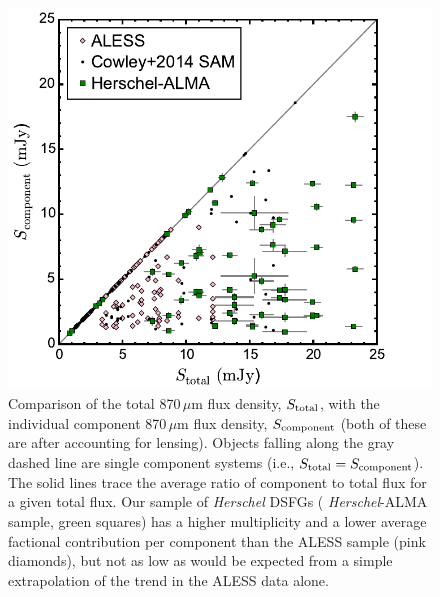 \documentclass[iop]{emulateapj}
\begin{document}
\begin{figure}[!tbp] 
\includegraphics[width=\linewidth]{../Figures/fluxtotalcomponent.pdf}

\caption{ Comparison of the total 870$\,\mu$m flux density, $S_{\rm total}$,
with the individual component 870$\,\mu$m flux density, $S_{\rm component}$
(both of these are after accounting for lensing).  Objects falling along the
gray dashed line are single component systems (i.e., $S_{\rm total} = S_{\rm
component}$).  The solid lines trace the average ratio of component to total
flux for a given total flux.  Our sample of {\it Herschel} DSFGs ({\it
Herschel}-ALMA sample,
green squares) has a higher multiplicity and a lower average factional
contribution per component than the ALESS sample (pink diamonds), but not as
low as would be expected from a simple extrapolation of the trend in the ALESS
data alone.} \label{fig:componentflux}

\end{figure}

\end{document}
